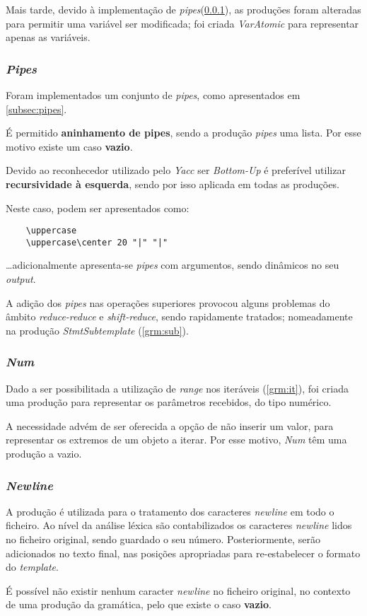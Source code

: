 \documentclass[../relatorio.tex]{subfiles}
\begin{document}
Mais tarde, devido à implementação de \textit{pipes}(\ref{grm:pipes}), 
as produções foram alteradas para permitir uma variável 
ser modificada; foi criada \textit{VarAtomic} para representar
apenas as variáveis.
 
\subsubsection{\textit{Pipes}} \label{grm:pipes}
Foram implementados um conjunto de \textit{pipes}, 
como apresentados em \ref{subsec:pipes}.

É permitido \textbf{aninhamento de pipes}, sendo a produção
\textit{pipes} uma lista.
Por esse motivo existe um caso \textbf{vazio}.

Devido ao reconhecedor utilizado pelo \textit{Yacc} ser \textit{Bottom-Up}
é preferível utilizar \textbf{recursividade à esquerda}, sendo por isso 
aplicada em todas as produções.

Neste caso, podem ser apresentados como:
\begin{verbatim}
    \uppercase
    \uppercase\center 20 "|" "|"
\end{verbatim}
\dots adicionalmente apresenta-se \textit{pipes} com argumentos, sendo 
dinâmicos no seu \textit{output}.

A adição dos \textit{pipes} nas operações superiores provocou 
alguns problemas do âmbito \textit{reduce-reduce} e \textit{shift-reduce},
sendo rapidamente tratados; nomeadamente na produção \textit{StmtSubtemplate} (\ref{grm:sub}).

\subsubsection{\textit{Num}} \label{grm:num}
Dado a ser possibilitada a utilização de \textit{range} nos iteráveis (\ref{grm:it}),
foi criada uma produção para representar os parâmetros recebidos, do tipo numérico.

A necessidade advém de ser oferecida a opção de não inserir um valor, para representar
os extremos de um objeto a iterar.
Por esse motivo, \textit{Num} têm uma produção a vazio.

\subsubsection{\textit{Newline}} \label{grm:nl}
A produção é utilizada para o tratamento dos caracteres \textit{newline}
em todo o ficheiro.
Ao nível da análise léxica são contabilizados os caracteres \textit{newline}
lidos no ficheiro original, sendo guardado o seu número.
Posteriormente, serão adicionados no texto final, nas 
posições apropriadas para re-estabelecer o formato do \textit{template}.

É possível não existir nenhum caracter \textit{newline} no ficheiro original,
no contexto de uma produção da gramática, pelo que existe o caso \textbf{vazio}.
\end{document}
